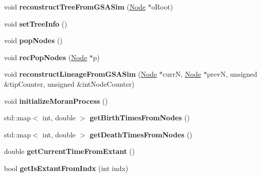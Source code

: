 \begin{DoxyCompactItemize}
\item 
\mbox{\label{class_species_tree_a9b22bdc02bf64315a85e1770a2e26030}} 
void {\bfseries reconstruct\+Tree\+From\+G\+S\+A\+Sim} (\mbox{\hyperlink{class_node}{Node}} $\ast$o\+Root)
\item 
\mbox{\label{class_species_tree_aea563f1022c8fbc7d0cb73d5169dd231}} 
void {\bfseries set\+Tree\+Info} ()
\item 
\mbox{\label{class_species_tree_acd341c4b7f6a009fa9eb2657392106d8}} 
void {\bfseries pop\+Nodes} ()
\item 
\mbox{\label{class_species_tree_a7dafd94885175051f8f2eee1df0db688}} 
void {\bfseries rec\+Pop\+Nodes} (\mbox{\hyperlink{class_node}{Node}} $\ast$p)
\item 
\mbox{\label{class_species_tree_a3cbfb25be6d326f6696a7475d29bfa80}} 
void {\bfseries reconstruct\+Lineage\+From\+G\+S\+A\+Sim} (\mbox{\hyperlink{class_node}{Node}} $\ast$currN, \mbox{\hyperlink{class_node}{Node}} $\ast$prevN, unsigned \&tip\+Counter, unsigned \&int\+Node\+Counter)
\item 
\mbox{\label{class_species_tree_a5697162b12530024340498f10bd3ab92}} 
void {\bfseries initialize\+Moran\+Process} ()
\item 
\mbox{\label{class_species_tree_a7e308ac0193a1bd6662e8b309a71f63c}} 
std\+::map$<$ int, double $>$ {\bfseries get\+Birth\+Times\+From\+Nodes} ()
\item 
\mbox{\label{class_species_tree_a1f7eb666255d2142fbde6828c8a5d21b}} 
std\+::map$<$ int, double $>$ {\bfseries get\+Death\+Times\+From\+Nodes} ()
\item 
\mbox{\label{class_species_tree_aeeab6072c1a0092c3e711adafcced587}} 
double {\bfseries get\+Current\+Time\+From\+Extant} ()
\item 
\mbox{\label{class_species_tree_a4ec054f9a22acabed3b4d5d69321512a}} 
bool {\bfseries get\+Is\+Extant\+From\+Indx} (int indx)
\item 

\end{DoxyCompactItemize}
